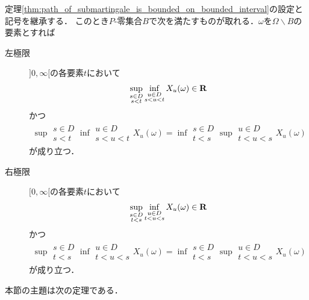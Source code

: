 	\begin{screen}
		\begin{thm}[劣マルチンゲールの殆ど全てのパスが各点で実数値の左極限及び右極限を持つ]
		\label{thm:almost_all_paths_of_submartingale_have_left_and_right_limits}
			定理\ref{thm:path_of_submartingale_is_bounded_on_bounded_interval}の設定と記号を継承する．
			このとき$P$-零集合$B$で次を満たすものが取れる．$\omega$を$\Omega \backslash B$の要素とすれば
			\begin{description}
				\item[左極限] $]0,\infty[$の各要素$t$において
					\begin{align}
						\operatorname*{sup}_{\substack{s \in D \\ s < t}} \operatorname*{inf}_{\substack{u \in D \\ s < u < t}} X_u(\omega) \in \mathbf{R}
					\end{align}
					かつ
					\begin{align}
						\sup{\substack{s \in D \\ s < t}}{\inf{\substack{u \in D \\ s < u < t}}{X_u(\omega)}} 
						= \inf{\substack{s \in D \\ t < s}}{\sup{\substack{u \in D \\ t < u < s}}{X_u(\omega)}}
					\end{align}
					が成り立つ．
				
				\item[右極限] $[0,\infty[$の各要素$t$において
					\begin{align}
						\operatorname*{sup}_{\substack{s \in D \\ t < s}} \operatorname*{inf}_{\substack{u \in D \\ t < u < s}} X_u(\omega) \in \mathbf{R}
					\end{align}
					かつ
					\begin{align}
						\sup{\substack{s \in D \\ t < s}}{\inf{\substack{u \in D \\ t < u < s}}{X_u(\omega)}} 
						= \inf{\substack{s \in D \\ t < s}}{\sup{\substack{u \in D \\ t < u < s}}{X_u(\omega)}}
					\end{align}
					が成り立つ．
			\end{description}
		\end{thm}
	\end{screen}
	
	本節の主題は次の定理である．
	
